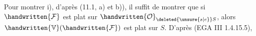 Pour montrer i), d'après (11.1, a) et b)), il suffit de montrer que si $\handwritten{\mathcal{F}}$ est plat sur $\handwritten{\mathcal{O}}_{\deleted{\unsure{s|e}}S}$,  alors $\handwritten{\mathbb{V}}(\handwritten{\mathcal{F}})$ est plat sur $S$. D'après (EGA III 1.4.15.5),
